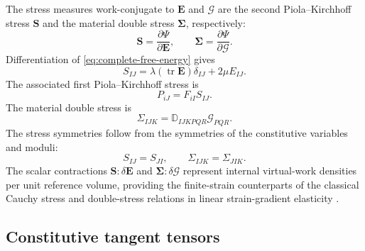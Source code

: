 \documentclass[preprint,12pt]{elsarticle}
\DeclareMathOperator{\tr}{tr}
\begin{document}
The stress measures work-conjugate to $\mathbf{E}$ and $\bm{\mathcal{G}}$
are the second Piola--Kirchhoff stress $\mathbf{S}$ and the material
double stress $\boldsymbol{\Sigma}$, respectively:
\begin{equation}
 \mathbf{S}=\frac{\partial\Psi}{\partial\mathbf{E}},
 \qquad
 \boldsymbol{\Sigma}=\frac{\partial\Psi}{\partial\bm{\mathcal{G}}}.
 \label{eq:work-conjugate-stresses}
\end{equation}
Differentiation of \eqref{eq:complete-free-energy} gives
\begin{equation}
 S_{IJ}=\lambda\left(\tr\mathbf{E}\right)\delta_{IJ}
 +2\mu E_{IJ}.
 \label{eq:second-piola-stress}
\end{equation}
The associated first Piola--Kirchhoff stress is
\begin{equation}
 P_{iJ}=F_{iI}S_{IJ}.
 \label{eq:first-piola-stress}
\end{equation}
The material double stress is
\begin{equation}
 \Sigma_{IJK}=\mathbb{D}_{IJKPQR}\mathcal{G}_{PQR}.
 \label{eq:double-stress}
\end{equation}
The stress symmetries follow from the symmetries of the constitutive
variables and moduli:
\begin{equation}
 S_{IJ}=S_{JI},
 \qquad
 \Sigma_{IJK}=\Sigma_{JIK}.
 \label{eq:stress-symmetries}
\end{equation}
The scalar contractions $\mathbf{S}:\delta\mathbf{E}$ and
$\boldsymbol{\Sigma}:\delta\bm{\mathcal{G}}$ represent internal virtual-work
densities per unit reference volume, providing the finite-strain
counterparts of the classical Cauchy stress and double-stress relations in
linear strain-gradient elasticity \cite{MindlinEshel1968,Germain1973}.

\subsection{Constitutive tangent tensors}
\label{sec:constitutive-tangents}
\end{document}
